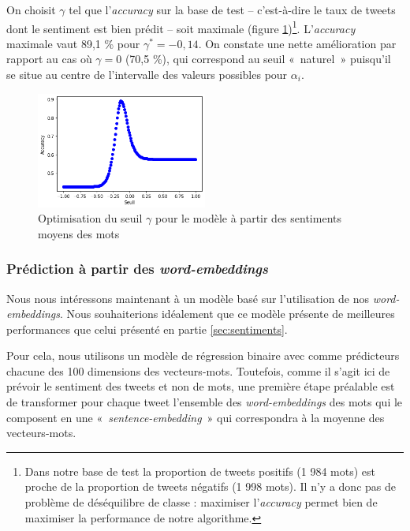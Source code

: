 \documentclass[11pt,french,french]{article}
\let\rmarkdownfootnote\footnote%
\def\footnote{\protect\rmarkdownfootnote}
\begin{document}
On choisit \(\gamma\) tel que l'\emph{accuracy} sur la base de test -- c'est-à-dire le taux de tweets dont le sentiment est bien prédit -- soit maximale (figure \ref{fig:max_baseline})\footnote{Dans notre base de test la proportion de tweets positifs (1 984 mots) est proche de la proportion de tweets négatifs (1 998 mots).
  Il n'y a donc pas de problème de déséquilibre de classe : maximiser l'\emph{accuracy} permet bien de maximiser la performance de notre algorithme.}. L'\emph{accuracy} maximale vaut 89,1 \% pour \(\gamma^* = -0,14\). On constate une nette amélioration par rapport au cas où \(\gamma = 0\) (70,5 \%), qui correspond au seuil «~naturel~» puisqu'il se situe au centre de l'intervalle des valeurs possibles pour \(\alpha_i\).

\begin{figure}
\begin{center}
\includegraphics[width=0.5\textwidth]{img/max_baseline.png}
\captionsetup{margin=0cm,format=hang,justification=justified}
\caption{Optimisation du seuil $\gamma$ pour le modèle à partir des sentiments moyens des mots}\label{fig:max_baseline}
\end{center}
\end{figure}

\hypertarget{sec:wordembeddings}{%
\subsubsection{\texorpdfstring{Prédiction à partir des \emph{word-embeddings}}{Prédiction à partir des word-embeddings}}\label{sec:wordembeddings}}

Nous nous intéressons maintenant à un modèle basé sur l'utilisation de nos \emph{word-embeddings}.
Nous souhaiterions idéalement que ce modèle présente de meilleures performances que celui présenté en partie \ref{sec:sentiments}.

Pour cela, nous utilisons un modèle de régression binaire avec comme prédicteurs chacune des 100 dimensions des vecteurs-mots.
Toutefois, comme il s'agit ici de prévoir le sentiment des tweets et non de mots, une première étape préalable est de transformer pour chaque tweet l'ensemble des \emph{word-embeddings} des mots qui le composent en une «~\emph{sentence-embedding}~» qui correspondra à la moyenne des vecteurs-mots.
\end{document}
